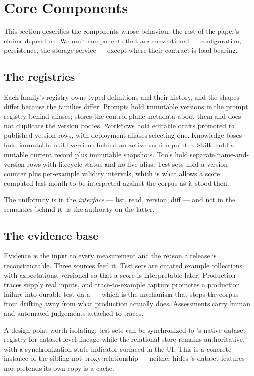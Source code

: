 \section{Core Components}
\label{sec:components}

This section describes the components whose behaviour the rest of the paper's
claims depend on. We omit components that are conventional --- configuration,
persistence, the storage service --- except where their contract is load-bearing.

\subsection{The registries}

Each family's registry owns typed definitions and their history, and the shapes
differ because the families differ. Prompts hold immutable versions in the
\mlflow{} prompt registry behind aliases; \sys stores the control-plane metadata
about them and does not duplicate the version bodies. Workflows hold editable
drafts promoted to published version rows, with deployment aliases selecting one.
Knowledge bases hold immutable build versions behind an active-version pointer.
Skills hold a mutable current record plus immutable snapshots. Tools hold separate
name-and-version rows with lifecycle status and no live alias. Test sets hold a
version counter plus per-example validity intervals, which is what allows a score
computed last month to be interpreted against the corpus as it stood then.

The uniformity is in the \emph{interface} --- list, read, version, diff --- and not
in the semantics behind it.  is the authority on the latter.

\subsection{The evidence base}

Evidence is the input to every measurement and the reason a release is
reconstructable. Three sources feed it. Test sets are curated example collections
with expectations, versioned so that a score is interpretable later. Production
traces supply real inputs, and trace-to-example capture promotes a production
failure into durable test data --- which is the mechanism that stops the corpus from
drifting away from what production actually does. Assessments carry human and
automated judgements attached to traces.

A design point worth isolating: test sets can be synchronized to \mlflow{}'s native
dataset registry for dataset-level lineage while the relational store remains
authoritative, with a synchronization-state indicator surfaced in the UI. This is a
concrete instance of the sibling-not-proxy relationship --- \sys neither hides
\mlflow{}'s dataset features nor pretends its own copy is a cache.

